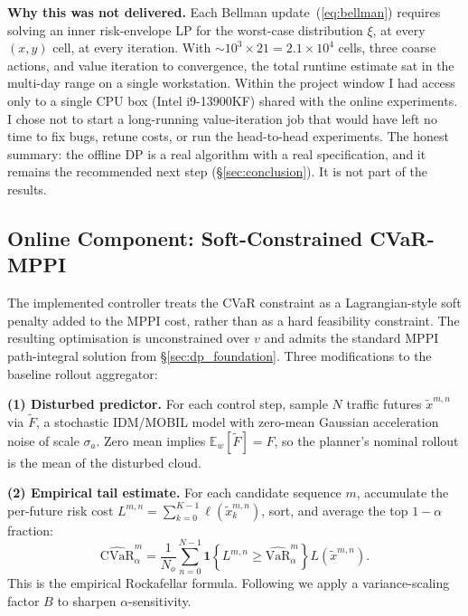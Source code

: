 \documentclass[letterpaper, 10 pt, conference]{ieeeconf}
\begin{document}
\textbf{Why this was not delivered.} Each Bellman update~(\ref{eq:bellman}) requires solving an inner risk-envelope LP for the worst-case distribution $\xi$, at every $(x, y)$ cell, at every iteration. With $\sim\!10^3 \times 21 = 2.1 \times 10^4$ cells, three coarse actions, and value iteration to convergence, the total runtime estimate sat in the multi-day range on a single workstation. Within the project window I had access only to a single CPU box (Intel i9-13900KF) shared with the online experiments. I chose not to start a long-running value-iteration job that would have left no time to fix bugs, retune costs, or run the head-to-head experiments. The honest summary: the offline DP is a real algorithm with a real specification, and it remains the recommended next step (\S\ref{sec:conclusion}). It is not part of the results.

\subsection{Online Component: Soft-Constrained CVaR-MPPI}
\label{sec:online}

The implemented controller treats the CVaR constraint as a Lagrangian-style soft penalty added to the MPPI cost, rather than as a hard feasibility constraint. The resulting optimisation is unconstrained over $v$ and admits the standard MPPI path-integral solution from \S\ref{sec:dp_foundation}. Three modifications to the baseline rollout aggregator:

\textbf{(1) Disturbed predictor.} For each control step, sample $N$ traffic futures $\tilde{x}^{m,n}$ via $\tilde{F}$, a stochastic IDM/MOBIL model with zero-mean Gaussian acceleration noise of scale $\sigma_a$. Zero mean implies $\mathbb{E}_w[\tilde{F}] = F$, so the planner's nominal rollout is the mean of the disturbed cloud.

\textbf{(2) Empirical tail estimate.} For each candidate sequence $m$, accumulate the per-future risk cost $L^{m,n} = \sum_{k=0}^{K-1} \ell(\tilde{x}^{m,n}_k)$, sort, and average the top $1-\alpha$ fraction:
\begin{equation}
\widehat{\mathrm{CVaR}}_\alpha^m = \frac{1}{N_o} \sum_{n=0}^{N-1} \mathbf{1}\!\left\{L^{m,n} \ge \widehat{\mathrm{VaR}}_\alpha^m\right\} L(\tilde{x}^{m,n}).
\label{eq:cvar_hat}
\end{equation}
This is the empirical Rockafellar formula. Following \cite{yin2022ra} we apply a variance-scaling factor $B$ to sharpen $\alpha$-sensitivity.
\end{document}
